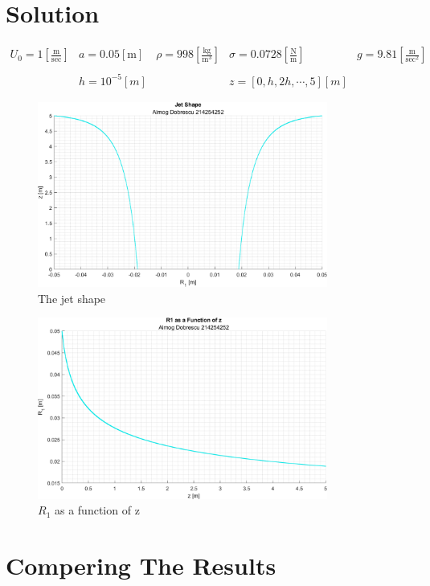 \documentclass[11pt, a4paper]{article}
\begin{document}
\newpage

\section{Solution}
\begin{equation}
    \begin{matrix}
        \displaystyle U_0=1\left[\frac{\mathrm{m}}{\mathrm{sec}}\right] & a=0.05\left[\mathrm{m}\right] & \displaystyle\rho=998\left[\frac{\mathrm{kg}}{\mathrm{m}^3}\right] & \displaystyle\sigma=0.0728\left[\frac{\mathrm{N}}{\mathrm{m}}\right] & \displaystyle g=9.81\left[\frac{\mathrm{m}}{\mathrm{sec}^2}\right] \\\\
        & h=10^{-5}\left[m\right] && z=\left[0,h,2h,\cdots,5\right]\left[m\right]
    \end{matrix}
\end{equation}
\begin{figure}[H]
    \centering
    \includegraphics[width=0.85\textwidth]{images/graph1.png}
    \caption{The jet shape}
    \label{fig:The_jet_shape}
\end{figure}
\begin{figure}[H]
    \centering
    \includegraphics[width=0.85\textwidth]{images/graph2.png}
    \caption{$R_1$ as a function of z}
    \label{fig:R_1_of_z}
\end{figure}

\section{Compering The Results}
\end{document}
